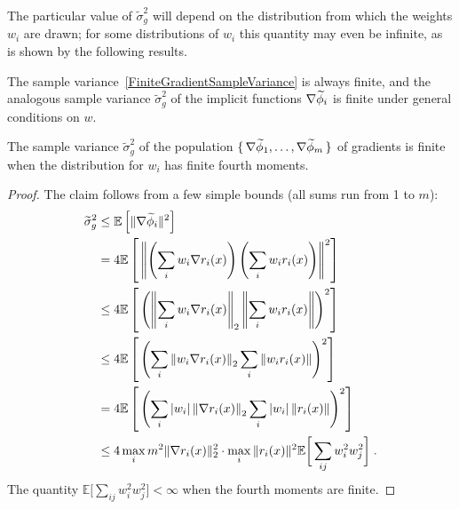 \documentclass[nospthms]{svjour3}
\numberwithin{equation}{section}
\def\phitilde{\skew3\widetilde\phi}
\def\sigmatilde{\widetilde\sigma}
\def\expval{\mathbb{E}}
\begin{document}
The particular value of $\sigmatilde_g^2$ will depend on the distribution
from which the weights $w_i$ are drawn; for some distributions of
$w_i$ this quantity may even be infinite, as is shown by the
following results.

The sample variance~\eqref{FiniteGradientSampleVariance} is always
finite, and the analogous sample variance $\sigmatilde_g^2$ of the
implicit functions $\nabla\phitilde_i$ is finite under general
conditions on $w$.

\begin{bproposition}
  \label{FiniteVarianceProposition}
  The sample variance $\sigmatilde_g^2$ of the population
  $\{\,\nabla\phitilde_1,\ldots,\nabla\phitilde_m\,\}$ of gradients is
  finite when the distribution for $w_i$ has finite fourth moments.
\end{bproposition}
\begin{proof}
The claim follows from a few simple bounds (all sums run from 1 to
  $m$):
 \[
 \begin{aligned}
   \sigmatilde_g^2
   &\leq \expval\left[\|\nabla\phitilde_{i}\|^2\right]
 \\&=
   4\expval
   \left[\,
     \left\|
       \left( \sum_i w_i \nabla  r_i(x)  \right)
       \left( \sum_i w_i r_i(x)         \right)
     \right\|^2
   \right]
 \\&\leq
  4 \expval
   \left[\,
     \left(\left\|
        \sum_i w_i \nabla  r_i(x) \right\|_2
\left\|       \sum_i w_i r_i(x)
     \right\|\right)^2
   \right]
\\&\leq
  4 \expval
   \left[\,
     \left(\sum_i\left\|
        w_i \nabla  r_i(x)  \right\|_2
\sum_i\left\|      w_i r_i(x)
     \right\|\right)^2
   \right]
\\ &=
  4 \expval
   \left[\,
     \left(\sum_i|w_i|\left\|
         \nabla  r_i(x)  \right\|_2
\sum_i |w_i|\left\|      r_i(x)
     \right\|\right)^2
   \right]
 \\&\leq
 4\max_i m^2\|\nabla r_i(x)\|_2^2\cdot\max_i\|r_i(x)\|^2
  \expval \bigg[\sum_{ij}w_i^2w_j^2\bigg]\;.
 \end{aligned}
 \]
The quantity $\expval \big[\sum_{ij}w_i^2w_j^2\big] <
 \infty$ when the fourth moments are finite.
\end{proof}
\end{document}
